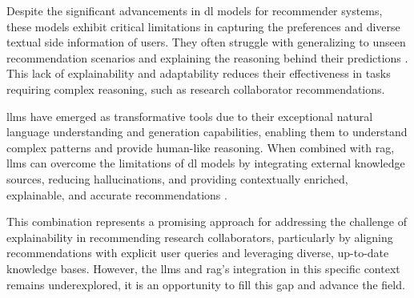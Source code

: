 Despite the significant advancements in \gls{dl} models for recommender systems, these models exhibit critical limitations in capturing the preferences and diverse textual side information of users.
They often struggle with generalizing to unseen recommendation scenarios and explaining the reasoning behind their predictions \cite{Zhao2024}.
This lack of explainability and adaptability reduces their effectiveness in tasks requiring complex reasoning, such as research collaborator recommendations.

\glspl{llm} have emerged as transformative tools due to their exceptional natural language understanding and generation capabilities, enabling them to understand complex patterns and provide human-like reasoning.
When combined with \gls{rag}, \glspl{llm} can overcome the limitations of \gls{dl} models by integrating external knowledge sources, reducing hallucinations, and providing contextually enriched, explainable, and accurate recommendations \cite{Deldjoo2024}.

This combination represents a promising approach for addressing the challenge of explainability in recommending research collaborators, particularly by aligning recommendations with explicit user queries and leveraging diverse, up-to-date knowledge bases.
However, the \glspl{llm} and \gls{rag}'s integration in this specific context remains underexplored, it is an opportunity to fill this gap and advance the field.